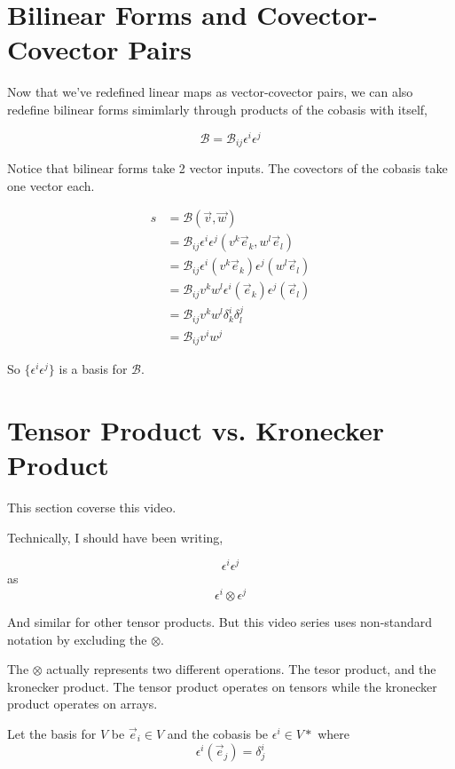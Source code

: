 \documentclass[12pt]{book}
\theoremstyle{plain}
\theoremstyle{definition}
\theoremstyle{ppart}
\theoremstyle{case}
\theoremstyle{solution}
\begin{document}
\section{Bilinear Forms and Covector-Covector Pairs}

Now that we've redefined linear maps as vector-covector pairs, we can also redefine bilinear forms simimlarly through
products of the cobasis with itself,

\[ \mathcal{B} = \mathcal{B}_{ij} \epsilon^i \epsilon^j \]

Notice that bilinear forms take 2 vector inputs. The covectors of the cobasis take one vector each.

\begin{align*}
  s &= \mathcal{B}(\vec{v}, \vec{w}) \\
  &= \mathcal{B}_{ij} \epsilon^i \epsilon^j (v^k \vec{e}_k, w^l \vec{e}_l) \\
  &= \mathcal{B}_{ij} \epsilon^i (v^k \vec{e}_k) \epsilon^j (w^l \vec{e}_l) \\
  &= \mathcal{B}_{ij} v^k w^l \epsilon^i (\vec{e}_k) \epsilon^j (\vec{e}_l) \\
  &= \mathcal{B}_{ij} v^k w^l \delta^i_k \delta^j_l \\
  &= \mathcal{B}_{ij} v^i w^j 
\end{align*}

So $\{\epsilon^i \epsilon^j\}$ is a basis for $\mathcal{B}$.

\section{Tensor Product vs. Kronecker Product}

This section coverse this \cite{youtube:tensor11} video.

Technically, I should have been writing,

\[ \epsilon^i \epsilon^j \]
as
\[ \epsilon^i \otimes \epsilon^j \]

And similar for other tensor products. But this video series uses non-standard notation by
excluding the $\otimes$.

The $\otimes$ actually represents two different operations. The tesor product, and the kronecker product.
The tensor product operates on tensors while the kronecker product operates on arrays.

Let the basis for $V$ be $\vec{e}_i \in V$ and the cobasis be $\epsilon^i \in V*$ where
\[ \epsilon^i(\vec{e}_j) = \delta^i_j \]
\end{document}
